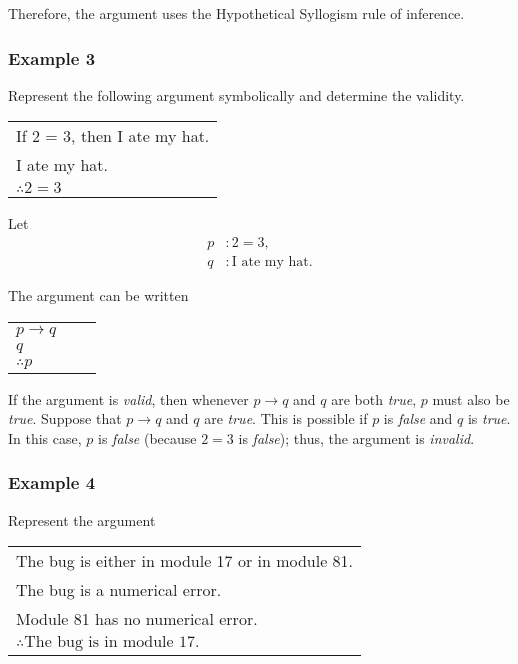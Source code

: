 Therefore, the argument uses the Hypothetical Syllogism rule of inference.

\subsubsection{Example 3}

Represent the following argument symbolically and determine the validity.

\begin{table}[h]
\centering
\begin{tabular}{l}
If 2 = 3, then I ate my hat.\\
I ate my hat.\\
\hline
$\therefore 2 = 3$
\end{tabular}
\end{table}

Let
\begin{align*}
    p&: 2 = 3,\\
    q&: \text{I ate my hat}.
\end{align*}

The argument can be written

\begin{table}[h]
\centering
\begin{tabular}{l@{\,}l@{\,}l@{\,}}
$p \rightarrow q$ & & \\
$q$ & & \\
\hline
$\therefore p$ & &
\end{tabular}
\end{table}

If the argument is \textit{valid}, then whenever $p \rightarrow q$ and $q$ are both \textit{true}, $p$ must also be \textit{true}.  Suppose that $p \rightarrow q$ and $q$ are \textit{true}.  This is possible if $p$ is \textit{false} and $q$ is \textit{true}.  In this case, $p$ is \textit{false} (because $2 = 3$ is \textit{false}); thus, the argument is \textit{invalid}.

\clearpage

\subsubsection{Example 4}

Represent the argument

\begin{table}[h]
\centering
\begin{tabular}{l}
The bug is either in module 17 or in module 81.\\
The bug is a numerical error.\\
Module 81 has no numerical error.\\
\hline
$\therefore \text{The bug is in module 17.}$
\end{tabular}
\end{table}

